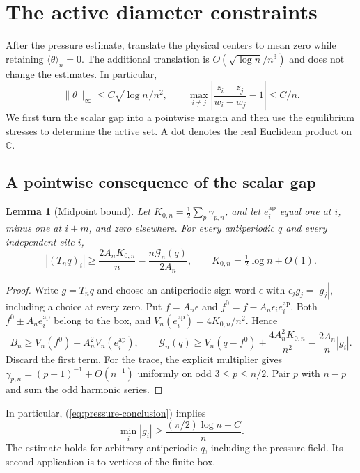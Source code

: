 \documentclass[11pt,reqno]{amsart}
\numberwithin{equation}{section}
\newtheorem{lemma}[theorem]{Lemma}
\theoremstyle{definition}
\theoremstyle{remark}
\newcommand{\C}{\mathbb C}
\newcommand{\av}[1]{\langle #1\rangle_n}
\newcommand{\norm}[1]{\lVert #1\rVert}
\begin{document}

\section{The active diameter constraints}\label{sec:lens}
After the pressure estimate, translate the physical centers to mean zero while retaining $\av\theta=0$. The additional translation is $O(\sqrt{\log n}/n^3)$ and does not change the estimates. In particular,
\begin{equation}\label{eq:lens-pointwise}
 \norm\theta_\infty\le C\sqrt{\log n}/n^2,\qquad
 \max_{i\ne j}\left|\frac{z_i-z_j}{w_i-w_j}-1\right|\le C/n.
\end{equation}
We first turn the scalar gap into a pointwise margin and then use the equilibrium stresses to determine the active set. A dot denotes the real Euclidean product on $\C$.

\subsection{A pointwise consequence of the scalar gap}
\begin{lemma}[Midpoint bound]\label{lem:midpoint}
Let $K_{0,n}=\frac12\sum_p\gamma_{p,n}$, and let $e_i^{\mathrm{ap}}$ equal one at $i$, minus one at $i+m$, and zero elsewhere. For every antiperiodic $q$ and every independent site $i$,
\begin{equation}\label{eq:midpoint-margin}
 |(T_nq)_i|\ge\frac{2A_nK_{0,n}}n-\frac{n\mathscr G_n(q)}{2A_n},
 \qquad K_{0,n}=\tfrac12\log n+O(1).
\end{equation}
\end{lemma}
\begin{proof}
Write $g=T_nq$ and choose an antiperiodic sign word $\epsilon$ with $\epsilon_jg_j=|g_j|$, including a choice at every zero. Put $f=A_n\epsilon$ and $f^0=f-A_n\epsilon_i e_i^{\mathrm{ap}}$. Both $f^0\pm A_ne^{\mathrm{ap}}_i$ belong to the box, and $V_n(e^{\mathrm{ap}}_i)=4K_{0,n}/n^2$. Hence
\[
 B_n\ge V_n(f^0)+A_n^2V_n(e^{\mathrm{ap}}_i),\qquad
 \mathscr G_n(q)\ge V_n(q-f^0)+\frac{4A_n^2K_{0,n}}{n^2}-\frac{2A_n}{n}|g_i|.
\]
Discard the first term. For the trace, the explicit multiplier gives $\gamma_{p,n}=(p+1)^{-1}+O(n^{-1})$ uniformly on odd $3\le p\le n/2$. Pair $p$ with $n-p$ and sum the odd harmonic series.
\end{proof}
In particular, (\ref{eq:pressure-conclusion}) implies
\begin{equation}\label{eq:potential-margin}
 \min_i|g_i|\ge\frac{(\pi/2)\log n-C}{n}.
\end{equation}
The estimate holds for arbitrary antiperiodic $q$, including the pressure field. Its second application is to vertices of the finite box.
\end{document}
